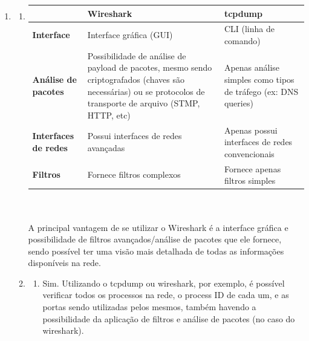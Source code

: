 \documentclass[12pt,a4paper]{report}
\begin{document}
\begin{enumerate}
    \item
    \begin{enumerate}
        \item 
        \begin{tabular}{ | m{2cm} | m{5cm}| m{4cm} | } 
            \hline
             & \textbf{Wireshark} & \textbf{tcpdump} \\
            \hline
            \textbf{Interface} & Interface gráfica (GUI) & CLI (linha de comando) \\
            \hline
            \textbf{Análise de pacotes} & Possibilidade de análise de payload de pacotes, mesmo sendo criptografados (chaves são necessárias) ou se protocolos de transporte de arquivo (STMP, HTTP, etc) & Apenas análise simples como tipos de tráfego (ex: DNS queries) \\
            \hline
            \textbf{Interfaces de redes} & Possui interfaces de redes avançadas &Apenas possui interfaces de redes convencionais \\ 
            \hline
            \textbf{Filtros} & Fornece filtros complexos & Fornece apenas filtros simples \\
            \hline
        \end{tabular}
        \\
        \\
        A principal vantagem de se utilizar o Wireshark é a interface gráfica e possibilidade de filtros avançados/análise de pacotes que ele fornece, sendo possível ter uma visão mais detalhada de todas as informações disponíveis na rede.
        \item
        \begin{enumerate}
            \item Sim. Utilizando o tcpdump ou wireshark, por exemplo, é possível verificar todos os processos na rede, o process ID de cada um, e as portas sendo utilizadas pelos mesmos, também havendo a possibilidade da aplicação de filtros e análise de pacotes (no caso do wireshark).
        \end{enumerate}
    \end{enumerate}
\end{enumerate}
\end{document}

